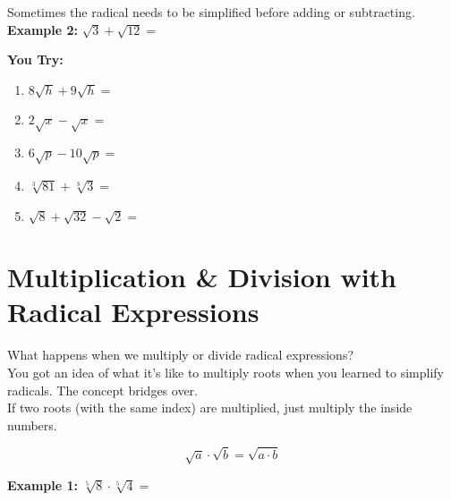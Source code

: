 \documentclass[12pt]{article}
\begin{document}
\vspace{1cm}

Sometimes the radical needs to be simplified before adding or subtracting.\\

\textbf{Example 2:} $\sqrt{3} + \sqrt{12}=$\\

\vspace{1cm}

\hrulefill

\textbf{You Try:}\\

\begin{enumerate}

	\item $8\sqrt{h}+ 9\sqrt{h}=$\\
	
	\item $2\sqrt{x} - \sqrt{x}=$\\
	
	\item $6\sqrt{p} - 10 \sqrt{p}=$\\
	
	\item $\sqrt[3]{81} + \sqrt[3]{3}=$\\
	
	\item $\sqrt{8} + \sqrt{32} - \sqrt{2}=$\\
	
\end{enumerate}

\section*{Multiplication \& Division with Radical Expressions}

What happens when we multiply or divide radical expressions?\\

You got an idea of what it's like to multiply roots when you learned to simplify radicals. The concept bridges over.\\

If two roots (with the same index) are multiplied, just multiply the inside numbers. 

$$\sqrt{a} \cdot \sqrt{b} = \sqrt{a \cdot b}$$

\textbf{Example 1:} $\sqrt[5]{8} \cdot \sqrt[5]{4}=$\\

\vspace{1cm}
\end{document}
